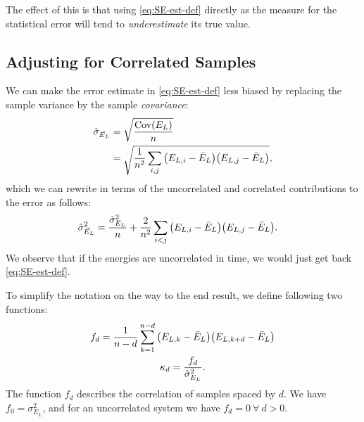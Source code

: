 \documentclass[a4paper, 11pt]{article}
\begin{document}
\begin{multicols}{2}

The effect of this is that using \eqref{eq:SE-est-def} directly as the measure for
the statistical error will tend to \textit{underestimate} its true value.

\subsection{Adjusting for Correlated Samples}

We can make the error estimate in \eqref{eq:SE-est-def} less biased by replacing
the sample variance by the sample \textit{covariance}:
\begin{align}
    \begin{split}
        \hat{\sigma}_{\bar{ E_L}} &= \sqrt{\frac{\text{Cov}(E_L)}{n}}\\
        &= \sqrt{\frac{1}{n^2}\sum_{i,j}\qty(E_{L,i} - \bar{E}_L)\qty(E_{L,j}-\bar{E}_L)},
    \end{split}
    \label{eq:SE-est-covar-def}
\end{align}
which we can rewrite in terms of the uncorrelated and correlated contributions
to the error as follows:
\begin{align}
    \begin{split}
    \hat{\sigma}^2_{\bar{E_L}} &=
        \frac{\hat{\sigma}^2_{E_L}}{n}
    + \frac{2}{n^2}\sum_{i<j}\qty(E_{L,i} - \bar{E}_L)\qty(E_{L,j}-\bar{E}_L).
    \end{split}\label{eq:SE-est-covar-expanded}
\end{align}
We observe that if the energies are uncorrelated in time, we would just get back
\eqref{eq:SE-est-def}.

To simplify the notation on the way to the end result, we define following two 
functions:
\begin{gather}
    f_d = \frac{1}{n-d}\sum_{k=1}^{n-d} \qty(E_{L,k} -
    \bar{E}_L)\qty(E_{L,k+d}-\bar{E}_L)\\
    \kappa_d = \frac{f_d}{\hat{\sigma}^2_{E_L}}.
\end{gather}
The function $f_d$ describes the correlation of samples spaced by $d$. We have
$f_0=\sigma_{E_L}^2$, and for an uncorrelated system we have $f_d=0\
\forall\ d>0$.


\end{multicols}
\end{document}
